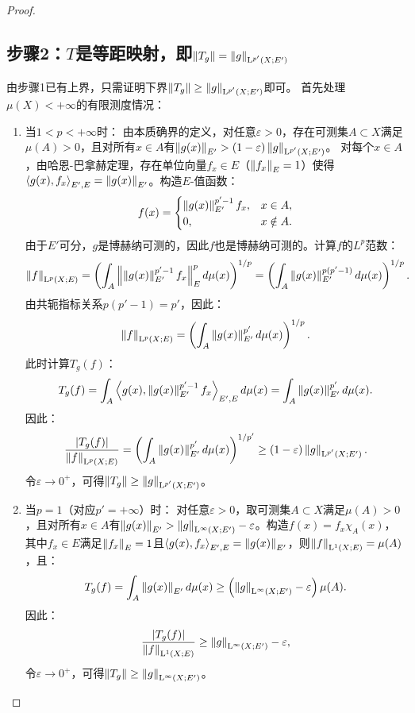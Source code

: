 \begin{proof}
\subsection{步骤2：$T$是等距映射，即$\left\| T_g \right\| = \left\| g \right\|_{\mathrm{L}^{p'}(X;E')}$}
由步骤1已有上界，只需证明下界$\left\| T_g \right\| \geq \left\| g \right\|_{\mathrm{L}^{p'}(X;E')}$即可。
首先处理$\mu(X)<+\infty$的有限测度情况：
\begin{enumerate}[label=(\arabic*), itemsep=0pt]
    \item 当$1<p<+\infty$时：
    由本质确界的定义，对任意$\varepsilon>0$，存在可测集$A\subset X$满足$\mu(A)>0$，且对所有$x\in A$有$\left\| g(x) \right\|_{E'} > (1-\varepsilon)\left\| g \right\|_{\mathrm{L}^{p'}(X;E')}$。
    对每个$x\in A$，由哈恩-巴拿赫定理，存在单位向量$f_x\in E$（$\left\| f_x \right\|_E=1$）使得$\left\langle g(x), f_x \right\rangle_{E',E} = \left\| g(x) \right\|_{E'}$。构造$E$-值函数：
    $$
    f(x) = \begin{cases}
    \left\| g(x) \right\|_{E'}^{p'-1} f_x, & x\in A, \\
    0, & x\notin A.
    \end{cases}
    $$
    由于$E'$可分，$g$是博赫纳可测的，因此$f$也是博赫纳可测的。计算$f$的$L^p$范数：
    $$
    \left\| f \right\|_{\mathrm{L}^{p}(X;E)} = \left( \int_A \left\| \left\| g(x) \right\|_{E'}^{p'-1} f_x \right\|_E^p d\mu(x) \right)^{1/p} = \left( \int_A \left\| g(x) \right\|_{E'}^{p(p'-1)} d\mu(x) \right)^{1/p}.
    $$
    由共轭指标关系$p(p'-1) = p'$，因此：
    $$
    \left\| f \right\|_{\mathrm{L}^{p}(X;E)} = \left( \int_A \left\| g(x) \right\|_{E'}^{p'} d\mu(x) \right)^{1/p}.
    $$
    此时计算$T_g(f)$：
    $$
    T_g(f) = \int_A \left\langle g(x), \left\| g(x) \right\|_{E'}^{p'-1} f_x \right\rangle_{E',E} d\mu(x) = \int_A \left\| g(x) \right\|_{E'}^{p'} d\mu(x).
    $$
    因此：
    $$
    \frac{\left| T_g(f) \right|}{\left\| f \right\|_{\mathrm{L}^{p}(X;E)}} = \left( \int_A \left\| g(x) \right\|_{E'}^{p'} d\mu(x) \right)^{1/p'} \geq (1-\varepsilon) \left\| g \right\|_{\mathrm{L}^{p'}(X;E')}.
    $$
    令$\varepsilon\to 0^+$，可得$\left\| T_g \right\| \geq \left\| g \right\|_{\mathrm{L}^{p'}(X;E')}$。

    \item 当$p=1$（对应$p'=+\infty$）时：
    对任意$\varepsilon>0$，取可测集$A\subset X$满足$\mu(A)>0$，且对所有$x\in A$有$\left\| g(x) \right\|_{E'} > \left\| g \right\|_{\mathrm{L}^{\infty}(X;E')} - \varepsilon$。构造$f(x) = f_x \chi_A(x)$，其中$f_x\in E$满足$\left\| f_x \right\|_E=1$且$\left\langle g(x), f_x \right\rangle_{E',E}=\left\| g(x) \right\|_{E'}$，则$\left\| f \right\|_{\mathrm{L}^{1}(X;E)} = \mu(A)$，且：
    $$
    T_g(f) = \int_A \left\| g(x) \right\|_{E'} d\mu(x) \geq \left( \left\| g \right\|_{\mathrm{L}^{\infty}(X;E')} - \varepsilon \right) \mu(A).
    $$
    因此：
    $$
    \frac{\left| T_g(f) \right|}{\left\| f \right\|_{\mathrm{L}^{1}(X;E)}} \geq \left\| g \right\|_{\mathrm{L}^{\infty}(X;E')} - \varepsilon,
    $$
    令$\varepsilon\to 0^+$，可得$\left\| T_g \right\| \geq \left\| g \right\|_{\mathrm{L}^{\infty}(X;E')}$。
\end{enumerate}


\end{proof}
